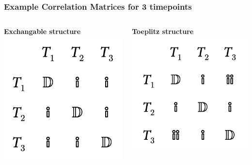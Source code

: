 \documentclass{beamer}
\begin{document}
\begin{frame}
\frametitle{Example Correlation Matrices for 3 timepoints}

\begin{columns}[c] %

\textbf{Exchangable structure}
\includegraphics[width = \textwidth]{exchangeable.png}


\textbf{Toeplitz structure}
\includegraphics[width = \textwidth]{toeplitz.png}

\end{columns}
\end{frame}
\end{document}
